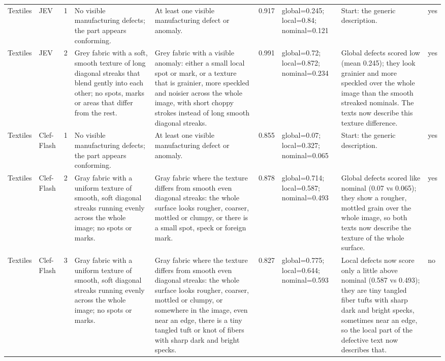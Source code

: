 \begin{table}
\begin{tabular}[t]{llrllrlll}
Textiles & JEV & 1 & No visible manufacturing defects; the part appears conforming. & At least one visible manufacturing defect or anomaly. & 0.917 & global=0.245; local=0.84; nominal=0.121 & Start: the generic description. & yes\\
Textiles & JEV & 2 & Grey fabric with a soft, smooth texture of long diagonal streaks that blend gently into each other; no spots, marks or areas that differ from the rest. & Grey fabric with a visible anomaly: either a small local spot or mark, or a texture that is grainier, more speckled and noisier across the whole image, with short choppy strokes instead of long smooth diagonal streaks. & 0.991 & global=0.72; local=0.872; nominal=0.234 & Global defects scored low (mean 0.245); they look grainier and more speckled over the whole image than the smooth streaked nominals. The texts now describe this texture difference. & yes\\
Textiles & Clef-Flash & 1 & No visible manufacturing defects; the part appears conforming. & At least one visible manufacturing defect or anomaly. & 0.855 & global=0.07; local=0.327; nominal=0.065 & Start: the generic description. & yes\\
\addlinespace
Textiles & Clef-Flash & 2 & Gray fabric with a uniform texture of smooth, soft diagonal streaks running evenly across the whole image; no spots or marks. & Gray fabric where the texture differs from smooth even diagonal streaks: the whole surface looks rougher, coarser, mottled or clumpy, or there is a small spot, speck or foreign mark. & 0.878 & global=0.714; local=0.587; nominal=0.493 & Global defects scored like nominal (0.07 vs 0.065); they show a rougher, mottled grain over the whole image, so both texts now describe the texture of the whole surface. & yes\\
Textiles & Clef-Flash & 3 & Gray fabric with a uniform texture of smooth, soft diagonal streaks running evenly across the whole image; no spots or marks. & Gray fabric where the texture differs from smooth even diagonal streaks: the whole surface looks rougher, coarser, mottled or clumpy, or somewhere in the image, even near an edge, there is a tiny tangled tuft or knot of fibers with sharp dark and bright specks. & 0.827 & global=0.775; local=0.644; nominal=0.593 & Local defects now score only a little above nominal (0.587 vs 0.493); they are tiny tangled fiber tufts with sharp dark and bright specks, sometimes near an edge, so the local part of the defective text now describes that. & no\\

\end{tabular}
\end{table}
